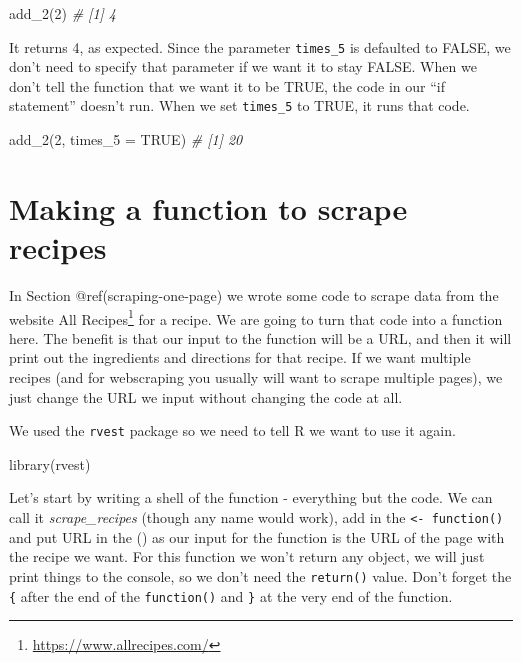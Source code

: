 \documentclass[
  a4paper,
]{krantz}
\makeatletter
\newenvironment{Shaded}{\begin{snugshade}}{\end{snugshade}}
\newcommand{\AttributeTok}[1]{\textcolor[rgb]{0.77,0.63,0.00}{#1}}
\newcommand{\CommentTok}[1]{\textcolor[rgb]{0.56,0.35,0.01}{\textit{#1}}}
\newcommand{\ConstantTok}[1]{\textcolor[rgb]{0.00,0.00,0.00}{#1}}
\newcommand{\DecValTok}[1]{\textcolor[rgb]{0.00,0.00,0.81}{#1}}
\newcommand{\FunctionTok}[1]{\textcolor[rgb]{0.00,0.00,0.00}{#1}}
\newcommand{\NormalTok}[1]{#1}
\renewcommand{\href}[2]{#2\footnote{\url{#1}}}
\newenvironment{kframe}{%
\medskip{}
\setlength{\fboxsep}{.8em}
 \def\at@end@of@kframe{}%
 \ifinner\ifhmode%
  \def\at@end@of@kframe{\end{minipage}}%
  \begin{minipage}{\columnwidth}%
 \fi\fi%
 \def\FrameCommand##1{\hskip\@totalleftmargin \hskip-\fboxsep
 \colorbox{shadecolor}{##1}\hskip-\fboxsep
     \hskip-\linewidth \hskip-\@totalleftmargin \hskip\columnwidth}%
 \MakeFramed {\advance\hsize-\width
   \@totalleftmargin\z@ \linewidth\hsize
   \@setminipage}}%
 {\par\unskip\endMakeFramed%
 \at@end@of@kframe}
\renewenvironment{Shaded}{\begin{kframe}}{\end{kframe}}
\makeatother
\begin{document}
\begin{Shaded}
\begin{Highlighting}[]
\FunctionTok{add\_2}\NormalTok{(}\DecValTok{2}\NormalTok{)}
\CommentTok{\# [1] 4}
\end{Highlighting}
\end{Shaded}

It returns 4, as expected. Since the parameter
\texttt{times\_5} is defaulted to FALSE, we don't need to
specify that parameter if we want it to stay FALSE. When we
don't tell the function that we want it to be TRUE, the code
in our ``if statement'' doesn't run. When we set
\texttt{times\_5} to TRUE, it runs that code.

\begin{Shaded}
\begin{Highlighting}[]
\FunctionTok{add\_2}\NormalTok{(}\DecValTok{2}\NormalTok{, }\AttributeTok{times\_5 =} \ConstantTok{TRUE}\NormalTok{)}
\CommentTok{\# [1] 20}
\end{Highlighting}
\end{Shaded}

\hypertarget{recipes-function}{%
\section{Making a function to scrape
recipes}\label{recipes-function}}

In Section @ref(scraping-one-page) we wrote some code to
scrape data from the website
\href{https://www.allrecipes.com/}{All Recipes} for a
recipe. We are going to turn that code into a function here.
The benefit is that our input to the function will be a URL,
and then it will print out the ingredients and directions
for that recipe. If we want multiple recipes (and for
webscraping you usually will want to scrape multiple pages),
we just change the URL we input without changing the code at
all.

We used the \texttt{rvest} package so we need to tell R we
want to use it again.

\begin{Shaded}
\begin{Highlighting}[]
\FunctionTok{library}\NormalTok{(rvest)}
\end{Highlighting}
\end{Shaded}

Let's start by writing a shell of the function - everything
but the code. We can call it \emph{scrape\_recipes} (though
any name would work), add in the
\texttt{\textless{}-\ function()} and put URL in the () as
our input for the function is the URL of the page with the
recipe we want. For this function we won't return any
object, we will just print things to the console, so we
don't need the \texttt{return()} value. Don't forget the
\texttt{\{} after the end of the \texttt{function()} and
\texttt{\}} at the very end of the function.
\end{document}
